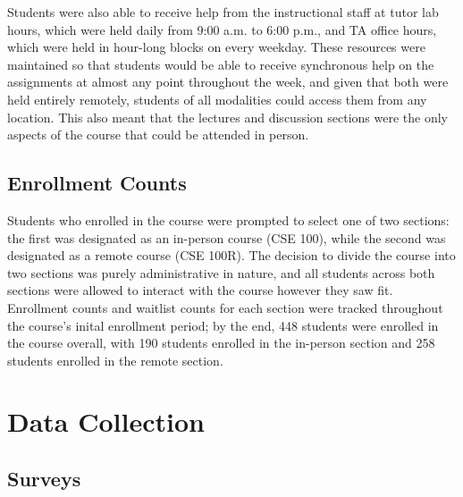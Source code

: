 Students were also able to receive help from the instructional staff at tutor lab hours, which were held daily from 9:00 a.m. to 6:00 p.m., and TA office hours, which were held in hour-long blocks on every weekday. These resources were maintained so that students would be able to receive synchronous help on the assignments at almost any point throughout the week, and given that both were held entirely remotely, students of all modalities could access them from any location. This also meant that the lectures and discussion sections were the only aspects of the course that could be attended in person.

\subsection{Enrollment Counts}

Students who enrolled in the course were prompted to select one of two sections: the first was designated as an in-person course (CSE 100), while the second was designated as a remote course (CSE 100R). The decision to divide the course into two sections was purely administrative in nature, and all students across both sections were allowed to interact with the course however they saw fit. Enrollment counts and waitlist counts for each section were tracked throughout the course's inital enrollment period; by the end, 448 students were enrolled in the course overall, with 190 students enrolled in the in-person section and 258 students enrolled in the remote section.

\section{Data Collection}

\subsection{Surveys}

